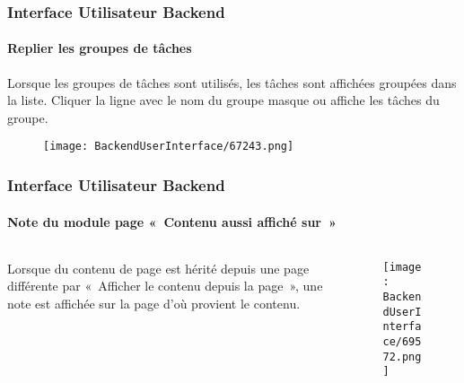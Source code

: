 \begin{frame}[fragile]
	\frametitle{Interface Utilisateur Backend}
	\framesubtitle{Replier les groupes de tâches}

	Lorsque les groupes de tâches sont utilisés, les tâches sont affichées groupées
	dans la liste. Cliquer la ligne avec le nom du groupe masque ou affiche les
	tâches du groupe.

	\begin{figure}\vspace{-0.3cm}
		\texttt{[image: BackendUserInterface/67243.png]}
	\end{figure}

\end{frame}

\begin{frame}[fragile]
	\frametitle{Interface Utilisateur Backend}
	\framesubtitle{Note du module page «~Contenu aussi affiché sur~»}

	\begin{columns}[T]
		\begin{column}{.3\textwidth}
			Lorsque du contenu de page est hérité depuis une page différente par «~Afficher
			le contenu depuis la page~», une note est affichée sur la page d'où provient le
			contenu.
		\end{column}

		\begin{column}{.7\textwidth}
			\begin{figure}\vspace*{-0.6cm}
				\texttt{[image: BackendUserInterface/69572.png]}
			\end{figure}
		\end{column}
	\end{columns}

\end{frame}

